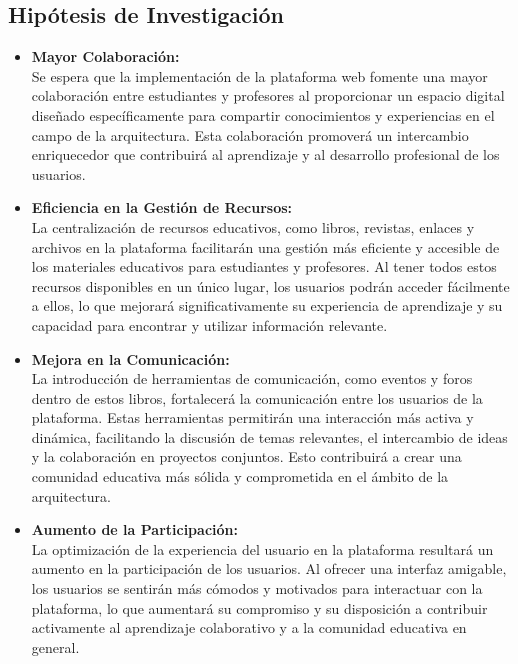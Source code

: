 \documentclass[a4paper, 12pt]{book}
\begin{document}
\subsection{Hipótesis de Investigación}
\label{subsec:Hipotesis de Investigacin}

\begin{itemize}
  \item \textbf{Mayor Colaboración:} \\ Se espera que la implementación de la plataforma web fomente una mayor colaboración entre estudiantes y profesores al proporcionar un espacio digital diseñado específicamente para compartir conocimientos y experiencias en el campo de la arquitectura. Esta colaboración promoverá un intercambio enriquecedor que contribuirá al aprendizaje y al desarrollo profesional de los usuarios.

  \item \textbf{Eficiencia en la Gestión de Recursos:} \\ La centralización de recursos educativos, como libros, revistas, enlaces y archivos en la plataforma facilitarán una gestión más eficiente y accesible de los materiales educativos para estudiantes y profesores. Al tener todos estos recursos disponibles en un único lugar, los usuarios podrán acceder fácilmente a ellos, lo que mejorará significativamente su experiencia de aprendizaje y su capacidad para encontrar y utilizar información relevante.

  \item \textbf{Mejora en la Comunicación:}\\ La introducción de herramientas de comunicación, como eventos y foros dentro de estos libros, fortalecerá la comunicación entre los usuarios de la plataforma. Estas herramientas permitirán una interacción más activa y dinámica, facilitando la discusión de temas relevantes, el intercambio de ideas y la colaboración en proyectos conjuntos. Esto contribuirá a crear una comunidad educativa más sólida y comprometida en el ámbito de la arquitectura.

  \item \textbf{Aumento de la Participación:} \\La optimización de la experiencia del usuario en la plataforma resultará un aumento en la participación de los usuarios. Al ofrecer una interfaz amigable, los usuarios se sentirán más cómodos y motivados para interactuar con la plataforma, lo que aumentará su compromiso y su disposición a contribuir activamente al aprendizaje colaborativo y a la comunidad educativa en general.
\end{itemize}
\end{document}
